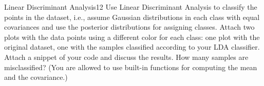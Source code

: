 \begin{questions}

\begin{question}{Linear Discriminant Analysis}{12}
Use Linear Discriminant Analysis to classify the points in the dataset, i.e., assume Gaussian distributions in each class with equal covariances and use the posterior distributions for assigning classes. Attach two plots with the data points using a different color for each class: one plot with the original dataset, one with the samples classified according to your LDA classifier. Attach a snippet of your code and discuss the results. How many samples are misclassified? (You are allowed to use built-in functions for computing the mean and the covariance.)

\begin{answer}\end{answer}
\end{question}


\end{questions}
